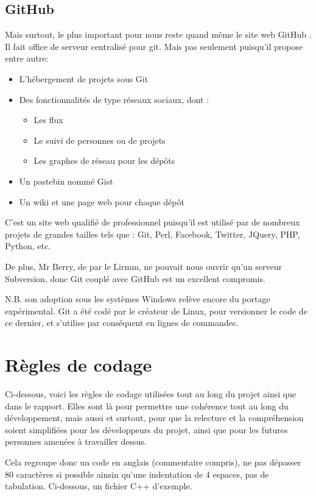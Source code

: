         \subsection{GitHub}
    Mais surtout, le plus important pour nous reste quand même le site web GitHub \cite{github}.
    Il fait office de serveur centralisé pour git. Mais pas seulement puisqu'il 
    propose entre autre:

    \begin{itemize}
    \item L'hébergement de projets sous Git
    \item Des fonctionnalités de type réseaux sociaux, dont :
        \begin{itemize}
        \item Les flux
        \item Le suivi de personnes ou de projets
        \item Les graphes de réseau pour les dépôts
        \end{itemize}
    \item Un pastebin nommé Gist
    \item Un wiki et une page web pour chaque dépôt
    \end{itemize}

C'est un site web qualifié de professionnel puisqu'il est utilisé par de 
nombreux projets de grandes tailles tels que : Git, Perl, Facebook, Twitter,
JQuery, PHP, Python, etc.

De plus, Mr Berry, de par le Lirmm, ne pouvait nous ouvrir qu'un serveur
Subversion, donc Git couplé avec GitHub est un excellent compromis.

N.B. son adoption sous les systèmes Windows relève encore du portage
expérimental. Git a été codé par le créateur de Linux, pour versionner le code
de ce dernier, et s'utilise par conséquent en lignes de commandes.

    \section{Règles de codage}

Ci-dessous, voici les règles de codage utilisées tout au long du projet
ainsi que dans le rapport. Elles sont là pour permettre une cohérence tout au
long du développement, mais aussi et surtout, pour que la relecture et la 
compréhension soient simplifiées pour les développeurs du projet, ainsi que pour les
futures personnes amenées à travailler dessus.

Cela regroupe donc un code en anglais (commentaire compris), ne pas dépasser 80 
caractères si possible ainsin qu'une indentation de 4 espaces, pas de tabulation.
Ci-dessous, un fichier C++ d'exemple.

